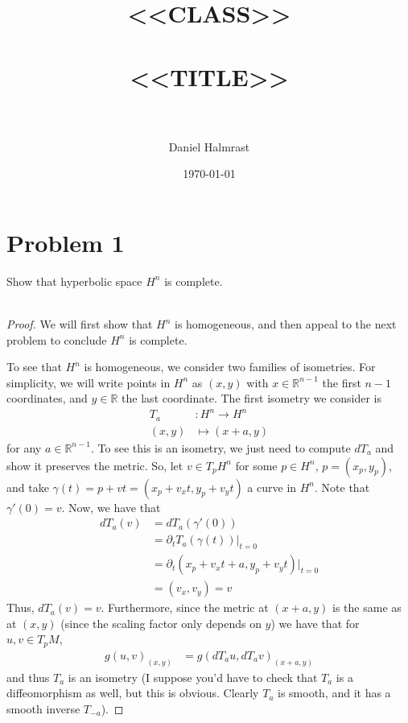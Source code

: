 \documentclass[fontsize=11pt]{scrartcl} %
\title{	
\normalfont \normalsize 
\textsc{<<CLASS>>} \\ [25pt] %
\horrule{0.5pt} \\[0.4cm] %
\huge <<TITLE>> \\ %
\horrule{2pt} \\[0.5cm] %
}
\author{Daniel Halmrast} %
\date{\normalsize\today} %
\numberwithin{equation}{section} %
\numberwithin{figure}{section} %
\numberwithin{table}{section} %
\newcommand{\R}{\mathbb{R}}
\begin{document}
\maketitle %

\section*{Problem 1}
Show that hyperbolic space $H^n$ is complete.
\\
\\
\begin{proof}
    We will first show that $H^n$ is homogeneous, and then appeal to the next
    problem to conclude $H^n$ is complete.

    To see that $H^n$ is homogeneous, we consider two families of isometries.
    For simplicity, we will write points in $H^n$ as $(x,y)$ with $x\in
    \R^{n-1}$ the first $n-1$ coordinates, and $y\in\R$ the last coordinate.
    The first isometry we consider is
    \[
        \begin{aligned}
        T_a&:H^n\to H^n\\
        (x,y)&\mapsto(x+a,y)
    \end{aligned}
    \]
    for any $a\in\R^{n-1}$. To see this is an isometry, we just need to compute
    $dT_a$ and show it preserves the metric. So, let $v\in T_pH^n$ for some
    $p\in H^n$, $p=(x_p,y_p)$, and take $\gamma(t) = p+vt = (x_p+v_xt,y_p+v_yt)$
    a curve in $H^n$.  Note that $\gamma'(0) = v$. Now, we have that
    \[
        \begin{aligned}
        dT_a(v) &= dT_a(\gamma'(0))\\
        &= \partial_t T_a(\gamma(t))|_{t=0}\\
        &=\partial_t (x_p +v_xt+a,y_p+v_yt)|_{t=0}\\
        &=(v_x,v_y) = v
    \end{aligned}
    \]
    Thus, $dT_a(v)=v$. Furthermore, since the metric at $(x+a,y)$ is the same as
    at $(x,y)$ (since the scaling factor only depends on $y$) we have that for
    $u,v\in T_pM$,
    \[
\begin{aligned}
    g(u,v)_{(x,y)} &= g(dT_au,dT_av)_{(x+a,y)}
\end{aligned}
    \]
    and thus $T_a$ is an isometry (I suppose you'd have to check that $T_a$ is a
        diffeomorphism as well, but this is obvious. Clearly $T_a$ is smooth,
    and it has a smooth inverse $T_{-a}$).


\end{proof}
\end{document}
